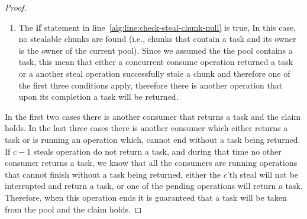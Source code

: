 \begin{proof}
\begin{enumerate}
 \item The {\bf if} statement in line~\ref{alg:line:check-steal-chunk-null} is true, In this case, no stealable chunks are found (i.e., chunks that contain a task and its owner is the owner of the current pool). Since we assumed the the pool contains a task, this mean that either a concurrent consume operation returned a task or a another steal operation successfully stole a chunk and therefore one of the first three conditions apply, therefore there is another operation that upon its completion a task will be returned.
\end{enumerate}
In the first two cases there is another consumer that returns a task and the claim holds. In the last three cases there is another consumer which either returns a task or is running an operation which, cannot end without a task being returned. If $c-1$ steals operation do not return a task, and during that time no other consumer returns a task, we know that all the consumers are running operations that cannot finish without a task being returned, either the $c$'th steal will not be interrupted and return a task, or one of the pending operations will return a task. Therefore, when this operation ends it is guaranteed that a task will be taken from the pool and the claim holds.
\end{proof}